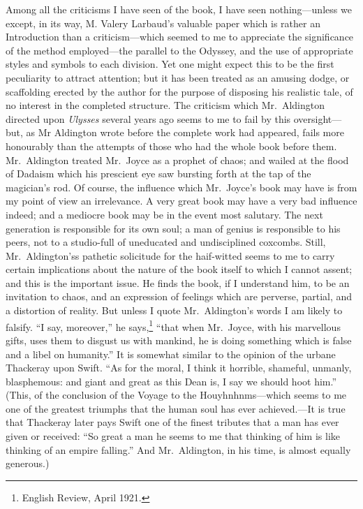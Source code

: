 Among all the criticisms I have seen of the book, I have seen
nothing---unless we except, in its way, M. Valery Larbaud's valuable
paper which is rather an Introduction than a criticism---which seemed to
me to appreciate the significance of the method employed---the parallel
to the Odyssey, and the use of appropriate styles and symbols to each
division. Yet one might expect this to be the first peculiarity to
attract attention; but it has been treated as an amusing dodge, or
scaffolding erected by the author for the purpose of disposing his
realistic tale, of no interest in the completed structure. The criticism
which Mr.~Aldington directed upon \emph{Ulysses} several years ago seems
to me to fail by this oversight---but, as Mr Aldington wrote before the
complete work had appeared, fails more honourably than the attempts of
those who had the whole book before them. Mr.~Aldington treated
Mr.~Joyce as a prophet of chaos; and wailed at the flood of Dadaism
which his prescient eye saw bursting forth at the tap of the magician's
rod. Of course, the influence which Mr.~Joyce's book may have is from my
point of view an irrelevance. A very great book may have a very bad
influence indeed; and a mediocre book may be in the event most salutary.
The next generation is responsible for its own soul; a man of genius is
responsible to his peers, not to a studio-full of uneducated and
undisciplined coxcombs. Still, Mr.~Aldington'ss pathetic solicitude for
the haif-witted seems to me to carry certain implications about the
nature of the book itself to which I cannot assent; and this is the
important issue. He finds the book, if I understand him, to be an
invitation to chaos, and an expression of feelings which are perverse,
partial, and a distortion of reality. But unless I quote Mr.~Aldington's
words I am likely to falsify. ``I say, moreover,'' he says,\footnote{English
  Review, April 1921.} ``that when Mr.~Joyce, with his marvellous gifts,
uses them to disgust us with mankind, he is doing something which is
false and a libel on humanity.'' It is somewhat similar to the opinion
of the urbane Thackeray upon Swift. ``As for the moral, I think it
horrible, shameful, unmanly, blasphemous: and giant and great as this
Dean is, I say we should hoot him.'' (This, of the conclusion of the
Voyage to the Houyhnhnms---which seems to me one of the greatest
triumphs that the human soul has ever achieved.---It is true that
Thackeray later pays Swift one of the finest tributes that a man has
ever given or received: ``So great a man he seems to me that thinking of
him is like thinking of an empire falling.'' And Mr.~Aldington, in his
time, is almost equally generous.)


